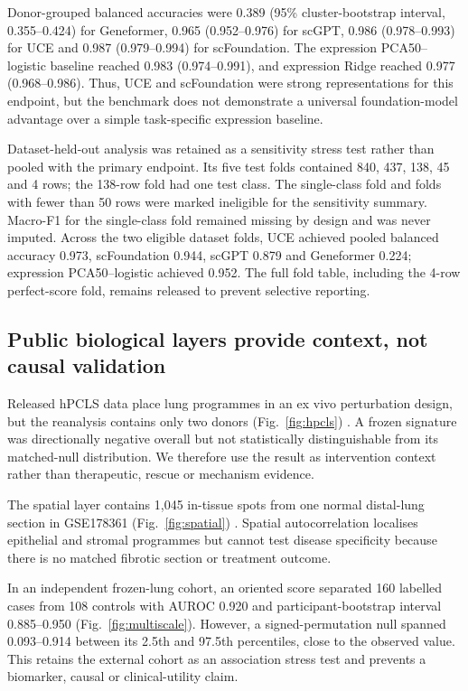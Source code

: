 \documentclass[11pt]{article}
\begin{document}
Donor-grouped balanced accuracies were 0.389 (95\% cluster-bootstrap interval, 0.355--0.424) for Geneformer, 0.965 (0.952--0.976) for scGPT, 0.986 (0.978--0.993) for UCE and 0.987 (0.979--0.994) for scFoundation. The expression PCA50--logistic baseline reached 0.983 (0.974--0.991), and expression Ridge reached 0.977 (0.968--0.986). Thus, UCE and scFoundation were strong representations for this endpoint, but the benchmark does not demonstrate a universal foundation-model advantage over a simple task-specific expression baseline.

Dataset-held-out analysis was retained as a sensitivity stress test rather than pooled with the primary endpoint. Its five test folds contained 840, 437, 138, 45 and 4 rows; the 138-row fold had one test class. The single-class fold and folds with fewer than 50 rows were marked ineligible for the sensitivity summary. Macro-F1 for the single-class fold remained missing by design and was never imputed. Across the two eligible dataset folds, UCE achieved pooled balanced accuracy 0.973, scFoundation 0.944, scGPT 0.879 and Geneformer 0.224; expression PCA50--logistic achieved 0.952. The full fold table, including the 4-row perfect-score fold, remains released to prevent selective reporting.

\subsection*{Public biological layers provide context, not causal validation}

Released hPCLS data place lung programmes in an ex vivo perturbation design, but the reanalysis contains only two donors (Fig.~\ref{fig:hpcls}) \cite{Lang2023}. A frozen signature was directionally negative overall but not statistically distinguishable from its matched-null distribution. We therefore use the result as intervention context rather than therapeutic, rescue or mechanism evidence.

The spatial layer contains 1,045 in-tissue spots from one normal distal-lung section in GSE178361 (Fig.~\ref{fig:spatial}) \cite{Murthy2022}. Spatial autocorrelation localises epithelial and stromal programmes but cannot test disease specificity because there is no matched fibrotic section or treatment outcome.

In an independent frozen-lung cohort, an oriented score separated 160 labelled cases from 108 controls with AUROC 0.920 and participant-bootstrap interval 0.885--0.950 (Fig.~\ref{fig:multiscale}). However, a signed-permutation null spanned 0.093--0.914 between its 2.5th and 97.5th percentiles, close to the observed value. This retains the external cohort as an association stress test and prevents a biomarker, causal or clinical-utility claim.
\end{document}
